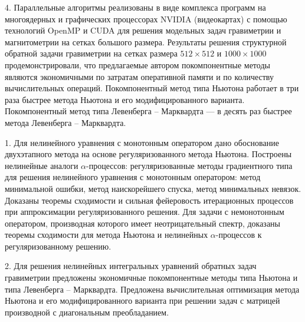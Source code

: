 \documentclass[%
autoref,     %
href,        %
facsimile,   %
colorlinks,  %
]{disser}
\begin{document}
4. Параллельные алгоритмы реализованы в виде комплекса программ на многоядерных и графических процессорах NVIDIA (видеокартах) с помощью технологий OpenMP и CUDA для решения модельных задач гравиметрии и магнитометрии на сетках большого размера. %
Результаты решения структурной обратной задачи гравиметрии на сетках размера $512\times 512$ и $1000\times 1000$ продемонстрировали, что предлагаемые автором покомпонентные методы являются экономичными по затратам оперативной памяти и по количеству вычислительных операций. Покомпонентный метод типа Ньютона работает в три раза быстрее метода Ньютона и его модифицированного варианта. Покомпонентный метод типа Левенберга -- Марквардта --- в десять раз быстрее метода Левенберга -- Марквардта.





1. Для нелинейного уравнения с монотонным оператором дано обоснование двухэтапного метода на основе регуляризованного метода Ньютона. 
Построены нелинейные аналоги $\alpha$-процессов:  регуляризованные методы градиентного типа для решения нелинейного уравнения с монотонным оператором: метод минимальной ошибки, метод наискорейшего спуска, метод минимальных невязок. Доказаны теоремы сходимости и сильная фейеровость итерационных процессов при аппроксимации регуляризованного решения. Для задачи с немонотонным оператором, производная которого имеет неотрицательный спектр, доказаны теоремы сходимости для метода  Ньютона и нелинейных $\alpha$-процессов к регуляризованному решению.

2. Для решения нелинейных интегральных уравнений обратных задач гравиметрии предложены экономичные покомпонентные методы 
типа Ньютона и типа Левенберга – Марквардта. Предложена вычислительная оптимизация метода 
Ньютона и его модифицированного варианта при решении задач 
с матрицей производной с диагональным преобладанием. 
\end{document}
